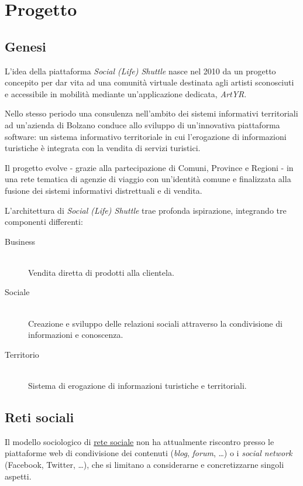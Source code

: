 \chapter{Progetto}
\label{ch:tesi:progetto}

\section{Genesi}
\label{sec:tesi:progetto:genesi}
L'idea della piattaforma \textit{Social (Life) Shuttle} nasce nel 2010 da un progetto concepito per dar vita ad una comunità virtuale destinata agli artisti sconosciuti e accessibile in mobilità mediante un'applicazione dedicata, \textit{ArtYR}.

Nello stesso periodo una consulenza nell'ambito dei sistemi informativi territoriali ad un'azienda di Bolzano conduce allo sviluppo di un'innovativa piattaforma software: un sistema informativo territoriale in cui l'erogazione di informazioni turistiche è integrata con la vendita di servizi turistici.

Il progetto evolve - grazie alla partecipazione di Comuni, Province e Regioni - in una rete tematica di agenzie di viaggio con un'identità comune e finalizzata alla fusione dei sistemi informativi distrettuali e di vendita.

L'architettura di \textit{Social (Life) Shuttle} trae profonda ispirazione, integrando tre componenti differenti:
\begin{description}
	\item[Business] \hfill \\
	Vendita diretta di prodotti alla clientela.
	\item[Sociale] \hfill \\
	Creazione e sviluppo delle relazioni sociali attraverso la condivisione di informazioni e conoscenza.
	\item[Territorio] \hfill \\
	Sistema di erogazione di informazioni turistiche e territoriali.
\end{description}

\section{Reti sociali}
\label{sec:tesi:progetto:reti-sociali}
Il modello sociologico di \underline{rete sociale} non ha attualmente riscontro presso le piattaforme web di condivisione dei contenuti (\textit{blog}, \textit{forum}, \ldots) o i \textit{social network} (Facebook, Twitter, \ldots), che si limitano a considerarne e concretizzarne singoli aspetti.

